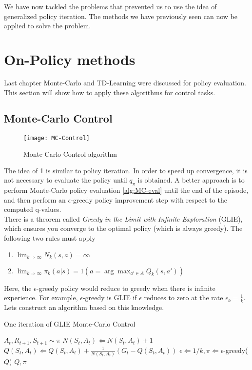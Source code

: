 We have now tackled the problems that prevented us to use the idea of generalized policy iteration. The methods we have previously seen can now be applied to solve the problem.

\section{On-Policy methods}

Last chapter Monte-Carlo and TD-Learning were discussed for policy evaluation. This section will show how to apply these algorithms for control tasks.

\subsection{Monte-Carlo Control}

\begin{figure}[H]
	\centering
	\texttt{[image: MC-Control]}
	\caption{Monte-Carlo Control algorithm}
	\label{fig:MC-control}
\end{figure}

The idea of \ref{fig:MC-control} is similar to policy iteration. In order to speed up convergence, it is not necessary to evaluate the policy until $q_\pi$ is obtained. A better approach is to perform Monte-Carlo policy evaluation \ref{alg:MC-eval} until the end of the episode, and then perform an $\epsilon$-greedy policy improvement step with respect to the computed q-values.\\

There is a theorem called \textit{Greedy in the Limit with Infinite Exploration} (GLIE), which ensures you converge to the optimal policy (which is always greedy). The following two rules must apply
\begin{enumerate}
	\item $\lim_{k \Rightarrow \infty} N_k(s, a) = \infty$
	\item $\lim_{k \Rightarrow \infty} \pi_k(a|s) = 1(a = \arg\max_{a' \in A} Q_k(s, a'))$
\end{enumerate}
Here, the $\epsilon$-greedy policy would reduce to greedy when there is infinite experience. For example, $\epsilon$-greedy is GLIE if $\epsilon$ reduces to zero at the rate $\epsilon_k = \frac{1}{k}$. Lets construct an algorithm based on this knowledge.

\begin{algorithm}[H]
	\caption{One iteration of GLIE Monte-Carlo Control}
	\label{alg:GLIE-MC-Control}
	\begin{algorithmic}
			\STATE $A_t, R_{t+1}, S_{t+1} \sim \pi$
			\STATE $N(S_t, A_t) \Leftarrow N(S_t, A_t) + 1$
			\STATE $Q(S_t, A_t) \Leftarrow Q(S_t, A_t) + \frac{1}{N(S_t, A_t)} (G_t - Q(S_t, A_t))$
		\ENDFOR
		\STATE $\epsilon \Leftarrow 1/k, \pi \Leftarrow \epsilon$-greedy($Q$)
		\RETURN $Q, \pi$
	\end{algorithmic}
\end{algorithm}

